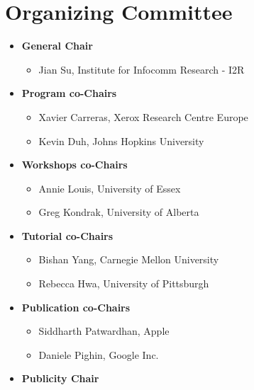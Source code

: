 \section{Organizing Committee}
\begin{itemize}[itemsep=7pt, leftmargin=0cm, label={}]
\item \textbf{General Chair}

\begin{itemize}[nosep, leftmargin=0.5cm, label={}]
\item Jian Su, Institute for Infocomm Research - I2R
\end{itemize}
\item \textbf{Program co-Chairs}

\begin{itemize}[nosep, leftmargin=0.5cm, label={}]
\item Xavier Carreras, Xerox Research Centre Europe 
\item Kevin Duh, Johns Hopkins University 
\end{itemize}
\item \textbf{Workshops co-Chairs}

\begin{itemize}[nosep, leftmargin=0.5cm, label={}]
\item Annie Louis, University of Essex
\item Greg Kondrak, University of Alberta
\end{itemize}
\item \textbf{Tutorial co-Chairs}

\begin{itemize}[nosep, leftmargin=0.5cm, label={}]
\item Bishan Yang, Carnegie Mellon University 
\item Rebecca Hwa, University of Pittsburgh 
\end{itemize}
\item \textbf{Publication co-Chairs} 

\begin{itemize}[nosep, leftmargin=0.5cm, label={}]
\item Siddharth Patwardhan, Apple 
\item Daniele Pighin, Google Inc.  
\end{itemize}
\item \textbf{Publicity Chair} 


\end{itemize}

